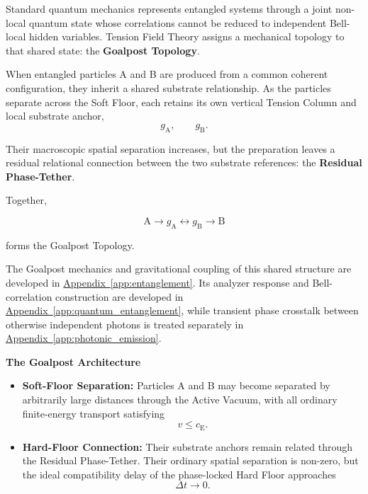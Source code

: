 Standard quantum mechanics represents entangled systems through a joint non-local quantum state whose correlations cannot be reduced to independent Bell-local hidden variables. Tension Field Theory assigns a mechanical topology to that shared state: the \textbf{Goalpost Topology}.

When entangled particles A and B are produced from a common coherent configuration, they inherit a shared substrate relationship. As the particles separate across the Soft Floor, each retains its own vertical Tension Column and local substrate anchor,
\begin{equation}
    g_{\mathrm A},
    \qquad
    g_{\mathrm B}.
\end{equation}

Their macroscopic spatial separation increases, but the preparation leaves a residual relational connection between the two substrate references: the \textbf{Residual Phase-Tether}.

Together,

\begin{equation}
    \mathrm A
    \longrightarrow
    g_{\mathrm A}
    \longleftrightarrow
    g_{\mathrm B}
    \longrightarrow
    \mathrm B
\end{equation}

forms the Goalpost Topology.

The Goalpost mechanics and gravitational coupling of this shared structure are developed in
\hyperref[app:entanglement]{Appendix~\ref*{app:entanglement}}.
Its analyzer response and Bell-correlation construction are developed in
\hyperref[app:quantum_entanglement]{Appendix~\ref*{app:quantum_entanglement}},
while transient phase crosstalk between otherwise independent photons is treated separately in
\hyperref[app:photonic_emission]{Appendix~\ref*{app:photonic_emission}}.

\vspace{0.5em}
\noindent\textbf{The Goalpost Architecture}

\begin{itemize}

    \item \textbf{Soft-Floor Separation:}
    Particles A and B may become separated by arbitrarily large distances through the Active Vacuum, with all ordinary finite-energy transport satisfying
    \begin{equation}
        v\leq c_{\mathrm E}.
    \end{equation}

    \item \textbf{Hard-Floor Connection:}
    Their substrate anchors remain related through the Residual Phase-Tether. Their ordinary spatial separation is non-zero, but the ideal compatibility delay of the phase-locked Hard Floor approaches
    \begin{equation}
        \Delta t\rightarrow0.
    \end{equation}

\end{itemize}

